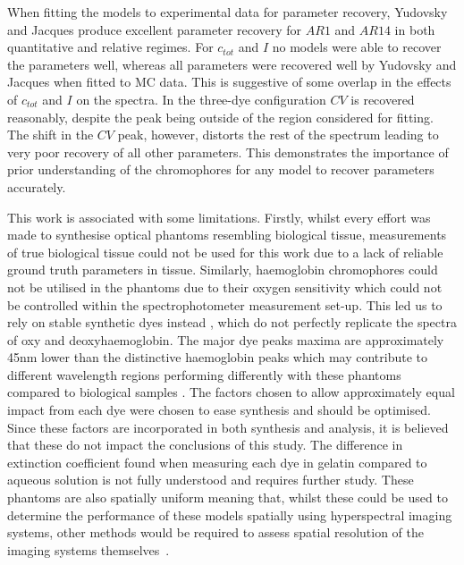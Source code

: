 When fitting the models to experimental data for parameter recovery, Yudovsky and Jacques produce excellent parameter recovery for $AR1$ and $AR14$ in both quantitative and relative regimes. For $c_{tot}$ and $I$ no models were able to recover the parameters well, whereas all parameters were recovered well by Yudovsky and Jacques when fitted to MC data. This is suggestive of some overlap in the effects of $c_{tot}$ and $I$ on the spectra. In the three-dye configuration $CV$ is recovered reasonably, despite the peak being outside of the region considered for fitting. The shift in the $CV$ peak, however, distorts the rest of the spectrum leading to very poor recovery of all other parameters. This demonstrates the importance of prior understanding of the chromophores for any model to recover parameters accurately. 

This work is associated with some limitations.
Firstly, whilst every effort was made to synthesise optical phantoms resembling biological tissue, measurements of true biological tissue could not be used for this work due to a lack of reliable ground truth parameters in tissue. %
Similarly, haemoglobin chromophores could not be utilised in the phantoms due to their oxygen sensitivity which could not be controlled within the spectrophotometer measurement set-up. This led us to rely on stable synthetic dyes instead
, which do not perfectly replicate the spectra of oxy and deoxyhaemoglobin. The major dye peaks maxima are approximately 45nm lower than the distinctive haemoglobin peaks which may contribute to different wavelength regions performing differently with these phantoms compared to biological samples
. 
The factors chosen to allow approximately equal impact from each dye were chosen to ease synthesis and should be optimised. Since these factors are incorporated in both synthesis and analysis, it is believed that these do not impact the conclusions of this study.
The difference in extinction coefficient found when measuring each dye in gelatin compared to aqueous solution is not fully understood and requires further study.
These phantoms are also spatially uniform meaning that, whilst these could be used to determine the performance of these models spatially using hyperspectral imaging systems, other methods would be required to assess spatial resolution of the imaging systems themselves~\citep{EdmundOptics2023, Torkildsen2018}.

